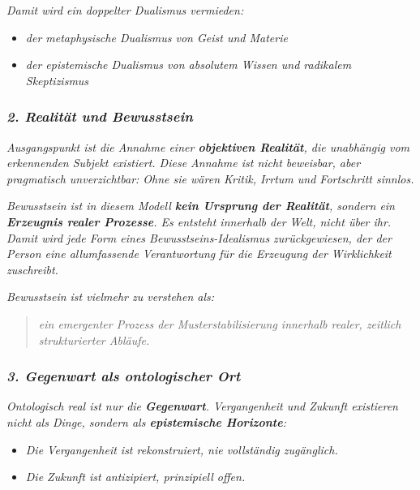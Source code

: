 \documentclass[
]{article}
\begin{document}
\emph{Damit wird ein doppelter Dualismus vermieden:}

\begin{itemize}
\item
  \emph{der metaphysische Dualismus von Geist und Materie}
\item
  \emph{der epistemische Dualismus von absolutem Wissen und radikalem Skeptizismus}
\end{itemize}

\subsubsection{\texorpdfstring{\emph{\textbf{2. Realität und Bewusstsein}}}{2. Realität und Bewusstsein}}\label{realituxe4t-und-bewusstsein}

\emph{Ausgangspunkt ist die Annahme einer \textbf{objektiven Realität}, die unabhängig vom erkennenden Subjekt existiert. Diese Annahme ist nicht beweisbar, aber pragmatisch unverzichtbar: Ohne sie wären Kritik, Irrtum und Fortschritt sinnlos.}

\emph{Bewusstsein ist in diesem Modell \textbf{kein Ursprung der Realität}, sondern ein \textbf{Erzeugnis realer Prozesse}. Es entsteht innerhalb der Welt, nicht über ihr. Damit wird jede Form eines Bewusstseins-Idealismus zurückgewiesen, der der Person eine allumfassende Verantwortung für die Erzeugung der Wirklichkeit zuschreibt.}

\emph{Bewusstsein ist vielmehr zu verstehen als:}

\begin{quote}
\emph{ein emergenter Prozess der Musterstabilisierung innerhalb realer, zeitlich strukturierter Abläufe.}
\end{quote}

\subsubsection{\texorpdfstring{\emph{\textbf{3. Gegenwart als ontologischer Ort}}}{3. Gegenwart als ontologischer Ort}}\label{gegenwart-als-ontologischer-ort}

\emph{Ontologisch real ist nur die \textbf{Gegenwart}. Vergangenheit und Zukunft existieren nicht als Dinge, sondern als \textbf{epistemische Horizonte}:}

\begin{itemize}
\item
  \emph{Die Vergangenheit ist rekonstruiert, nie vollständig zugänglich.}
\item
  \emph{Die Zukunft ist antizipiert, prinzipiell offen.}
\end{itemize}
\end{document}
